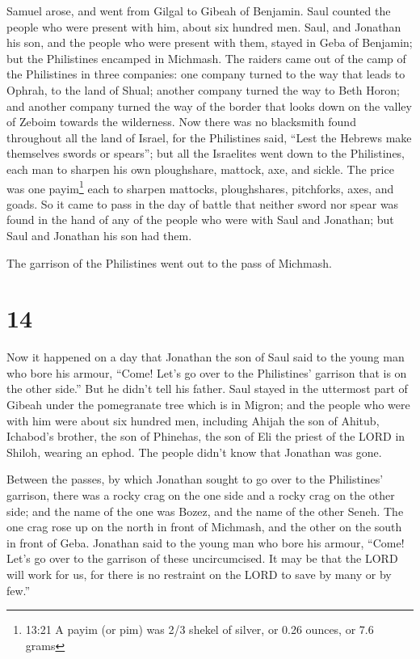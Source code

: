  Samuel arose, and went from Gilgal to Gibeah of Benjamin.
Saul counted the people who were present with him, about six hundred
men.  Saul, and Jonathan his son, and the people who were
present with them, stayed in Geba of Benjamin; but the Philistines
encamped in Michmash.  The raiders came out of the camp of
the Philistines in three companies: one company turned to the way that
leads to Ophrah, to the land of Shual;  another company
turned the way to Beth Horon; and another company turned the way of the
border that looks down on the valley of Zeboim towards the wilderness.
 Now there was no blacksmith found throughout all the land
of Israel, for the Philistines said, ``Lest the Hebrews make themselves
swords or spears'';  but all the Israelites went down to
the Philistines, each man to sharpen his own ploughshare, mattock, axe,
and sickle.  The price was one payim\footnote{13:21 A payim
  (or pim) was 2/3 shekel of silver, or 0.26 ounces, or 7.6 grams} each
to sharpen mattocks, ploughshares, pitchforks, axes, and goads.
 So it came to pass in the day of battle that neither sword
nor spear was found in the hand of any of the people who were with Saul
and Jonathan; but Saul and Jonathan his son had them.

 The garrison of the Philistines went out to the pass of
Michmash.

\hypertarget{section-13}{%
\section{14}\label{section-13}}

 Now it happened on a day that Jonathan the son of Saul said
to the young man who bore his armour, ``Come! Let's go over to the
Philistines' garrison that is on the other side.'' But he didn't tell
his father.  Saul stayed in the uttermost part of Gibeah
under the pomegranate tree which is in Migron; and the people who were
with him were about six hundred men,  including Ahijah the
son of Ahitub, Ichabod's brother, the son of Phinehas, the son of Eli
the priest of the LORD in Shiloh, wearing an ephod. The people didn't
know that Jonathan was gone.

 Between the passes, by which Jonathan sought to go over to
the Philistines' garrison, there was a rocky crag on the one side and a
rocky crag on the other side; and the name of the one was Bozez, and the
name of the other Seneh.  The one crag rose up on the north
in front of Michmash, and the other on the south in front of Geba.
 Jonathan said to the young man who bore his armour, ``Come!
Let's go over to the garrison of these uncircumcised. It may be that the
LORD will work for us, for there is no restraint on the LORD to save by
many or by few.''

